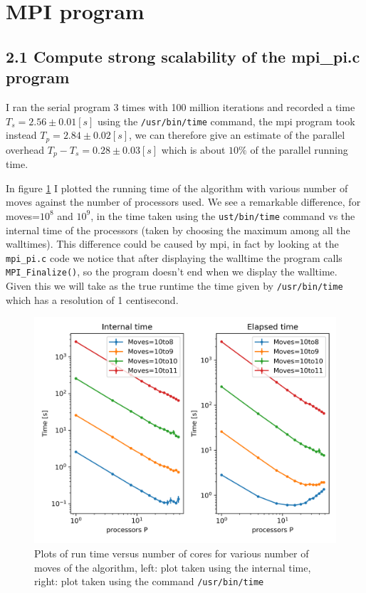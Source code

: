 \documentclass[a4paper]{article}
\begin{document}
\section{MPI program}
\subsection*{2.1 Compute strong scalability of the mpi\_pi.c program}
I ran the serial program 3 times with 100 million iterations and recorded a time $T_s=2.56\pm0.01 [s]$ using the \texttt{/usr/bin/time} command, the mpi program took instead $T_{p}=2.84\pm0.02 [s]$, we can therefore give an estimate of the parallel overhead $T_{p} - T_s = 0.28 \pm 0.03 [s]$ which is about $10\%$ of the parallel running time.

In figure \ref{fig:strong_times} I plotted the running time of the algorithm with various number of moves against the number of processors used. We see a remarkable difference, for moves=$10^8$ and $10^9$, in the time taken using the \texttt{ust/bin/time} command vs the internal time of the processors (taken by choosing the maximum among all the walltimes). This difference could be caused by mpi, in fact by looking at the \texttt{mpi\_pi.c} code we notice that after displaying the walltime the program calls \texttt{MPI\_Finalize()}, so the program doesn't end when we display the walltime. Given this we will take as the true runtime the time given by \texttt{/usr/bin/time} which has a resolution of 1 centisecond.

\begin{figure}[h]
    \centering
    \includegraphics[scale=0.9]{strong_scaling_times.png}
    \caption{Plots of run time versus number of cores for various number of moves of the algorithm, left: plot taken using the internal time, right: plot taken using the command \texttt{/usr/bin/time}}
    \label{fig:strong_times}
\end{figure}
\end{document}
